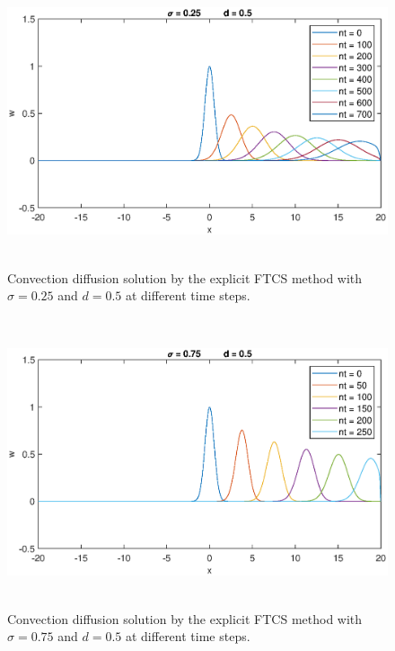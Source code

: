 \documentclass[letterpaper,12pt]{article}
\begin{document}
\begin{figure}[!ht] 
	\centering 
	\includegraphics[max height=8.5cm]{graphs/FTCS/ConvectionDiffusion/sigma025d05.eps}
	\caption{Convection diffusion solution by the explicit FTCS method with $\sigma= 0.25$ and $d=0.5$ at different time steps.}
	 \label{fig:FTCSsigma025d05}
\end{figure}
\newpage
\begin{figure}[!ht] 
	\centering 
	\includegraphics[max height=8.5cm]{graphs/FTCS/ConvectionDiffusion/sigma075d05.eps}
	\caption{Convection diffusion solution by the explicit FTCS method with $\sigma= 0.75$ and $d=0.5$ at different time steps.}
	 \label{fig:FTCSsigma075d05}
\end{figure}
\end{document}
